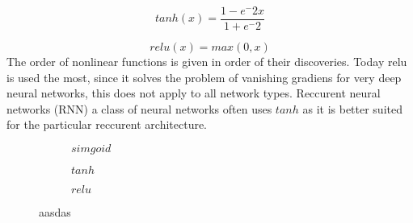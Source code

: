 \documentclass[times, utf8, diplomski]{fer}
\begin{document}
\begin{equation} \label{tanh}
	tanh(x) = \frac{1 - e^-2x}{1 + e^-2}
\end{equation}

\begin{equation} \label{relu}
	relu(x) = max(0, x)
\end{equation}
The order of nonlinear functions is given in order of their discoveries. Today relu is used the most, since it solves the problem of vanishing gradiens for very deep neural networks, this does not apply to all network types. Reccurent neural networks (RNN) a class of neural networks often uses $tanh$ as it is better suited for the particular reccurent architecture.

\begin{figure}
    \begin{subfigure}[b]{0.32\textwidth}
        \centering
        \caption{$simgoid$}
        \label{fig:sigmoid}
    \end{subfigure}
    \begin{subfigure}[b]{0.32\textwidth}
    \centering
        \caption{$tanh$}   
        \label{fig:tanh}
    \end{subfigure}
    \begin{subfigure}[b]{0.32\textwidth}
        \centering
        \caption{$relu$}
        \label{fig:relu}
    \end{subfigure}
\caption{aasdas} 
\label{fig:subfig1.a.4}
\end{figure}
\end{document}
